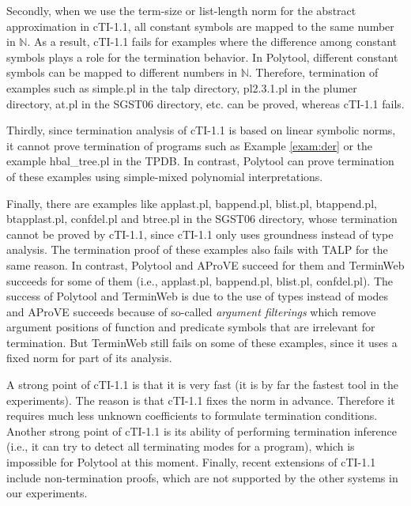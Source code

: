 \documentclass[envcountsame]{tlp}
\newcounter{ex:der-lastsymconsctr}
\begin{document}
Secondly, when we use the term-size or list-length norm for
the abstract approximation in \textsf{cTI-1.1}, all constant symbols are mapped to the same
number in $\mathbb{N}$.
As a result, \textsf{cTI-1.1} fails  for examples where
the difference among constant symbols plays a role for the termination
behavior. 
In \textsf{Polytool}, different constant symbols can be mapped to different
numbers in $\mathbb{N}$. Therefore, termination of 
examples such as \textsf{simple.pl} in the
\textsf{talp} directory,
\textsf{pl2.3.1.pl} in the \textsf{plumer} directory, \textsf{at.pl} in the
\textsf{SGST06} directory, etc. can be proved, whereas \textsf{cTI-1.1} fails.



Thirdly, since termination analysis of \textsf{cTI-1.1} is based on linear
symbolic norms, it cannot prove termination of
programs such as Example \ref{exam:der} or the example \textsf{hbal\_tree.pl} in
the TPDB. 
In contrast,
\textsf{Polytool} can prove termination of these examples using simple-mixed
polynomial interpretations. 

Finally, there are examples like \textsf{applast.pl},
\textsf{bappend.pl},
\textsf{blist.pl}, \textsf{btappend.pl}, \textsf{btapplast.pl},
  \textsf{confdel.pl} and
\textsf{btree.pl} in the \textsf{SGST06} directory, 
whose termination cannot be proved by
\textsf{cTI-1.1}, since
\textsf{cTI-1.1} only uses groundness instead of type analysis.
The termination proof of these examples also fails with
 \textsf{TALP} for the same reason. In
contrast,
\textsf{Polytool} and \textsf{AProVE}
succeed for them and \textsf{TerminWeb} succeeds for some of them (i.e., \textsf{applast.pl},
	\textsf{bappend.pl}, \textsf{blist.pl}, \textsf{confdel.pl}). The
success of
  \textsf{Polytool} and \textsf{TerminWeb} is due to the use of types
  instead of modes and \textsf{AProVE} succeeds because of
so-called \emph{argument filterings} which
remove argument positions of function and
predicate symbols that are irrelevant for termination.
 But \textsf{TerminWeb} still fails on some of these examples, since it uses a fixed
  norm for part of its analysis.





A strong point of \textsf{cTI-1.1} is that it is very fast (it is by far 
the fastest tool in the experiments). The reason is
that \textsf{cTI-1.1} fixes the norm in advance. Therefore it requires much
less unknown coefficients to formulate termination conditions.  
Another strong point of \textsf{cTI-1.1} is its ability of performing
termination inference (i.e., it can try to detect all terminating modes for a
program), 
which is impossible for \textsf{Polytool} at this
moment. 
Finally, recent extensions of \textsf{cTI-1.1} include non-termination proofs,
which are not supported by the other systems in our experiments.
\end{document}
